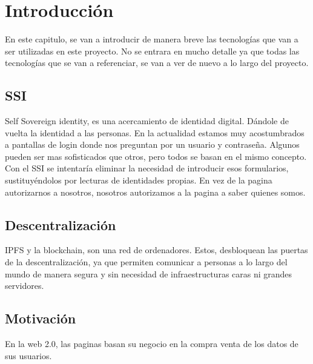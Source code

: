 \chapter{Introducción}\label{Introducción}

\thispagestyle{fancy}


En este capitulo, se van a introducir de manera breve las tecnologías que van a ser utilizadas en este proyecto. No se entrara en mucho detalle ya que todas las tecnologías que se van a referenciar, se van a ver de nuevo a lo largo del proyecto.
\section{SSI}
Self Sovereign identity, es una acercamiento de identidad digital. Dándole de vuelta la identidad a las personas. En la actualidad estamos muy acostumbrados a pantallas de login donde nos preguntan por un usuario y contraseña. Algunos pueden ser mas sofisticados que otros, pero todos se basan en el mismo concepto.
Con el SSI se intentaría eliminar la necesidad de introducir esos formularios, sustituyéndolos por lecturas de identidades propias. En vez de la pagina autorizarnos a nosotros, nosotros autorizamos a la pagina a saber quienes somos.

\section*{Descentralización}
IPFS y la blockchain, son una red de ordenadores. Estos, desbloquean las puertas de la descentralización, ya que permiten comunicar a personas a lo largo del mundo de manera segura y sin necesidad de infraestructuras caras ni grandes servidores.

\section*{Motivación}
En la web 2.0, las paginas basan su negocio en la compra venta de los datos de sus usuarios.

\newpage
\thispagestyle{empty}